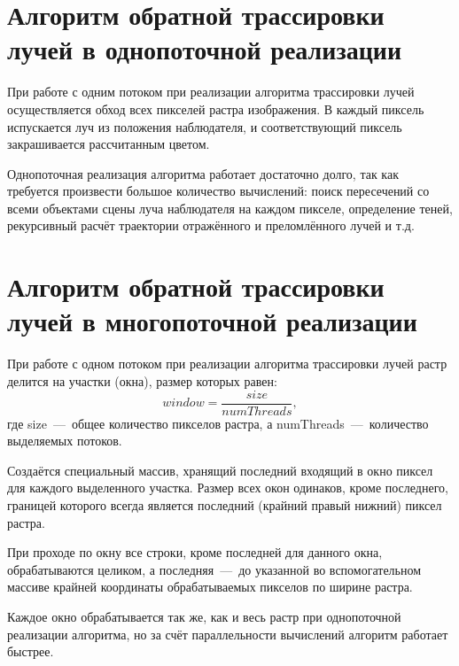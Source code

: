 \section{Алгоритм обратной трассировки лучей в однопоточной реализации}
При работе с одним потоком при реализации алгоритма трассировки лучей осуществляется обход всех пикселей растра изображения. В каждый пиксель испускается луч из положения наблюдателя, и соответствующий пиксель закрашивается рассчитанным цветом.

Однопоточная реализация алгоритма работает достаточно долго, так как требуется произвести большое количество вычислений: поиск пересечений со всеми объектами сцены луча наблюдателя на каждом пикселе, определение теней, рекурсивный расчёт траектории отражённого и преломлённого лучей и т.д.

\section{Алгоритм обратной трассировки лучей в многопоточной реализации}
При работе с одном потоком при реализации алгоритма трассировки лучей растр делится на участки (окна), размер которых равен:
\begin{equation}
	window = \frac{size}{numThreads},
\end{equation}
где size~---~общее количество пикселов растра, а numThreads~---~количество выделяемых потоков.

Создаётся специальный массив, хранящий последний входящий в окно пиксел для каждого выделенного участка. Размер всех окон одинаков, кроме последнего, границей которого всегда является последний (крайний правый нижний) пиксел растра.

При проходе по окну все строки, кроме последней для данного окна, обрабатываются целиком, а последняя~---~до указанной во вспомогательном массиве крайней координаты обрабатываемых пикселов по ширине растра.

Каждое окно обрабатывается так же, как и весь растр при однопоточной реализации алгоритма, но за счёт параллельности вычислений алгоритм работает быстрее.

\newpage